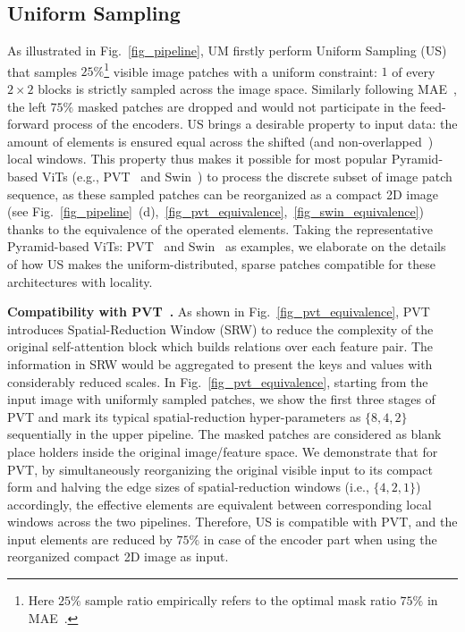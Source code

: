 \documentclass{article}
\begin{document}
\subsection{Uniform Sampling}
\label{sec_US}
As illustrated in Fig.~\ref{fig_pipeline}, UM firstly perform Uniform Sampling (US) that samples $25\%$\footnote{\scriptsize Here $25\%$ sample ratio empirically refers to the optimal mask ratio $75\%$ in MAE~\cite{he2021masked}.} visible image patches with a uniform constraint: $1$ of every $2 \times 2$ blocks is strictly sampled across the image space. Similarly following MAE~\cite{he2021masked}, the left $75\%$ masked patches are dropped and would not participate in the feed-forward process of the encoders.
US brings a desirable property to input data: the amount of elements is ensured equal across the shifted (and non-overlapped~\cite{wang2021pyramid,liu2021swin}) local windows. This property thus makes it possible for most popular Pyramid-based ViTs (e.g., PVT~\cite{wang2021pyramid} and Swin~\cite{liu2021swin}) to process the discrete subset of image patch sequence, as these sampled patches can be reorganized as a compact 2D image (see Fig.~\ref{fig_pipeline}~(d),~\ref{fig_pvt_equivalence},~\ref{fig_swin_equivalence}) thanks to the equivalence of the operated elements.
Taking the representative Pyramid-based ViTs: PVT~\cite{wang2021pyramid} and Swin~\cite{liu2021swin} as examples, we elaborate on the details of how US makes the uniform-distributed, sparse patches compatible for these architectures with locality. 

\textbf{Compatibility with PVT~\cite{wang2021pyramid}.} As shown in Fig.~\ref{fig_pvt_equivalence}, PVT introduces Spatial-Reduction Window (SRW) to reduce the complexity of the original self-attention block which builds relations over each feature pair. The information in SRW would be aggregated to present the keys and values with considerably reduced scales. In Fig.~\ref{fig_pvt_equivalence}, starting from the input image with uniformly sampled patches, we show the first three stages of PVT and mark its typical spatial-reduction hyper-parameters as $\{8, 4, 2\}$ sequentially in the upper pipeline. The masked patches are considered as blank place holders inside the original image/feature space. We demonstrate that for PVT, by simultaneously reorganizing the original visible input to its compact form and halving the edge sizes of spatial-reduction windows (i.e., $\{4, 2, 1\}$) accordingly, the effective elements are equivalent between corresponding local windows across the two pipelines. Therefore, US is compatible with PVT, and the input elements are reduced by $75\%$ in case of the encoder part when using the reorganized compact 2D image as input.
\end{document}
